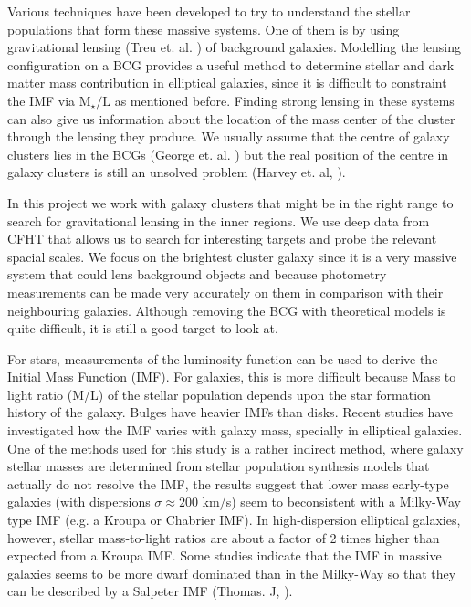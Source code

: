 Various techniques have been developed to try to understand the stellar populations that form these massive systems. One of them is by using gravitational lensing (Treu et. al. \citeyear{Reference1})  of  background galaxies. Modelling the lensing configuration on a BCG provides a useful method to determine stellar and dark matter mass contribution in elliptical galaxies, since it is difficult to constraint the IMF via $\textrm{M}_{\star}/\text{L}$ as mentioned before. Finding strong lensing in these systems can also give us information about the location of the mass center of the cluster through the lensing they produce. We usually assume that the centre of galaxy clusters lies in the BCGs (George et. al. \citeyear{Reference18}) but the real position of the centre in galaxy clusters is still an unsolved problem (Harvey et. al, \citeyear{Reference13}). 

In this project we work with galaxy clusters that might be in the right range to search for gravitational lensing in the inner regions. We use deep data from CFHT that allows us to search for interesting targets and probe the relevant spacial scales. We focus on the brightest cluster galaxy since it is a very massive system that could lens background objects and because photometry measurements can be made very accurately on them in comparison with their neighbouring galaxies. Although removing the BCG with theoretical models is quite difficult, it is still a good target to look at. 

For stars, measurements of the luminosity function can be used to derive the Initial Mass Function (IMF). For galaxies, this is more difficult because Mass to light ratio (M/L) of the stellar population depends upon the star formation history of the galaxy. Bulges have heavier IMFs than disks. Recent studies have investigated how the IMF varies with galaxy mass, specially in elliptical galaxies. One of the methods used for this study is a rather indirect method, where galaxy stellar masses are determined from stellar population synthesis models that actually do not resolve the IMF, the results suggest that lower mass early-type galaxies (with dispersions $\sigma \approx 200$ km/s) seem to beconsistent with a Milky-Way type IMF (e.g. a Kroupa or Chabrier IMF). In high-dispersion elliptical galaxies, however, stellar mass-to-light ratios are about a factor of 2 times higher than expected from a Kroupa IMF. Some studies indicate that the IMF in massive galaxies seems to be more dwarf dominated than in the Milky-Way so that they can be described by a Salpeter IMF (Thomas. J, \citeyear{Reference28}).


